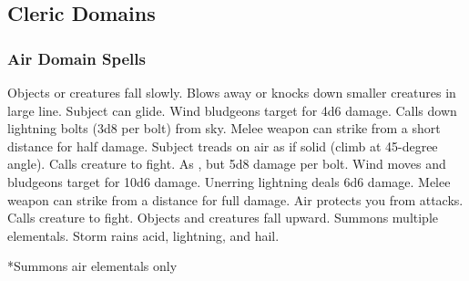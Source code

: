 \subsection{Cleric Domains}\label{Cleric Domains}

\begin{comment}
\subsubsection{Example Domain}
\parhead{Domain Power}
\parhead{Channelled Domain Power}
\parhead{Greater Domain Power}
\parhead{Greater Channelled Domain Power}
\parhead{Domain Mastery}
\begin{spelllist}
    \spellhead[1]{}
    \spellhead[1]{}
    \spellhead[2]{}
    \spellhead[2]{}
    \spellhead[3]{}
    \spellhead[3]{}
    \spellhead[4]{}
    \spellhead[4]{}
    \spellhead[5]{}
    \spellhead[5]{}
    \spellhead[6]{}
    \spellhead[6]{}
    \spellhead[7]{}
    \spellhead[7]{}
    \spellhead[8]{}
    \spellhead[8]{}
    \spellhead[9]{}
    \spellhead[9]{}
\end{spelllist}
\end{comment}

\subsubsection{Air Domain Spells}

\begin{spelllist}
     Objects or creatures fall slowly.
     Blows away or knocks down smaller creatures in large line.
     Subject can glide.
     Wind bludgeons target for 4d6 damage.
     Calls down lightning bolts (3d8 per bolt) from sky.
     Melee weapon can strike from a short distance for half damage.
     Subject treads on air as if solid (climb at 45-degree angle).
     Calls creature to fight.
     As , but 5d8 damage per bolt.
     Wind moves and bludgeons target for 10d6 damage.
     Unerring lightning deals 6d6 damage.
     Melee weapon can strike from a distance for full damage.
     Air protects you from attacks. 
     Calls creature to fight.
     Objects and creatures fall upward.
     Summons multiple elementals.
     Storm rains acid, lightning, and hail.
\end{spelllist}
*Summons air elementals only

